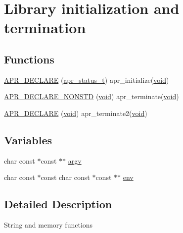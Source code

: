 \hypertarget{group__apr__library}{}\section{Library initialization and termination}
\label{group__apr__library}
\subsection*{Functions}
\begin{DoxyCompactItemize}
\item 
\hyperlink{group__apr__library_ga8f566b11a5d9ff6ba8ca300735c37a4e}{A\+P\+R\+\_\+\+D\+E\+C\+L\+A\+RE} (\hyperlink{group__apr__errno_gaa5105fa83cc322f09382292db8b47593}{apr\+\_\+status\+\_\+t}) apr\+\_\+initialize(\hyperlink{group__MOD__ISAPI_gacd6cdbf73df3d9eed42fa493d9b621a6}{void})
\item 
\hyperlink{group__apr__library_gac8b5703810f2f9398da0ee2ef448aced}{A\+P\+R\+\_\+\+D\+E\+C\+L\+A\+R\+E\+\_\+\+N\+O\+N\+S\+TD} (\hyperlink{group__MOD__ISAPI_gacd6cdbf73df3d9eed42fa493d9b621a6}{void}) apr\+\_\+terminate(\hyperlink{group__MOD__ISAPI_gacd6cdbf73df3d9eed42fa493d9b621a6}{void})
\item 
\hyperlink{group__apr__library_ga5bce35b8cafc88f9fbc9abfa1490265b}{A\+P\+R\+\_\+\+D\+E\+C\+L\+A\+RE} (\hyperlink{group__MOD__ISAPI_gacd6cdbf73df3d9eed42fa493d9b621a6}{void}) apr\+\_\+terminate2(\hyperlink{group__MOD__ISAPI_gacd6cdbf73df3d9eed42fa493d9b621a6}{void})
\end{DoxyCompactItemize}
\subsection*{Variables}
\begin{DoxyCompactItemize}
\item 
char const $\ast$const $\ast$$\ast$ \hyperlink{group__apr__library_ga3f1a46fc4a1c2094aab2cb6bcff1b502}{argv}
\item 
char const $\ast$const char const $\ast$const $\ast$$\ast$ \hyperlink{group__apr__library_ga308c47150e0bdc75827dc1c2e2965066}{env}
\end{DoxyCompactItemize}


\subsection{Detailed Description}
String and memory functions 

